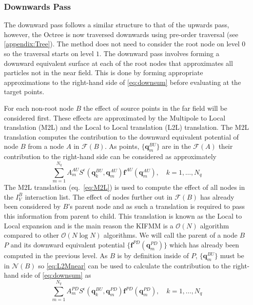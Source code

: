 \subsubsection{Downwards Pass}
The downward pass follows a similar structure to that of the upwards pass, however, the Octree is now traversed downwards using pre-order traversal (see \cref{appendix:Tree}). The method does not need to consider the root node on level $0$ so the traversal starts on level $1$. The downward pass involves forming a downward equivalent surface at each of the root nodes that approximates all particles not in the near field. This is done by forming appropriate approximations to the right-hand side of \cref{eq:downsum} before evaluating at the target points.

For each non-root node $B$ the effect of source points in the far field will be considered first. These effects are approximated by the Multipole to Local translation (M2L) and the Local to Local translation (L2L) translation. The M2L translation computes the contribution to the downward equivalent potential of node $B$ from a node $A$ in $\mathcal{F}(B)$. As points, $\{\bm{q}^{BU}_m\}$ are in the $\mathcal{F}(A)$ their contribution to the right-hand side can be considered as approximately
\begin{equation}
\label{eq:M2L}
\sum_{m=1}^{N_{q}} A_{m}^{A U} S^\epsilon\left(\bm{q}_{k}^{B U}, \bm{q}_{m}^{A U}\right) \bm{f}^{A U}\left(\bm{q}_{m}^{A U}\right), \quad k=1,\dots,N_q
\end{equation}
The M2L translation (eq.~\ref{eq:M2L}) is used to compute the effect of all nodes in the $I_V^B$ interaction list. The effect of nodes further out in $\mathcal{F}(B)$ has already been considered by $B$'s parent node and as such a translation is required to pass this information from parent to child. This translation is known as the Local to Local expansion and is the main reason the KIFMM is a $\mathcal{O}(N)$ algorithm compared to other $\mathcal{O}(N\log N)$ algorithms. We will call the parent of a node $B$ $P$ and its downward equivalent potential $\{\bm{f}^{PD}(\bm{q}^{PD}_m)\}$ which has already been computed in the previous level. As $B$ is by definition inside of $P$, $\{\bm{q}^{BU}_m\}$ must be in $\mathcal{N}(B)$ so \cref{eq:L2Mnear} can be used to calculate the contribution to the right-hand side of \cref{eq:downsum} as
\begin{equation}
\label{eq:L2L}
\sum_{m=1}^{N_{q}} A_{m}^{P D} S^\epsilon\left(\bm{q}_{k}^{B U}, \bm{q}_{m}^{P D}\right) \bm{f}^{P D}\left(\bm{q}_{m}^{P D}\right), \quad k=1,\dots,N_q
\end{equation}
